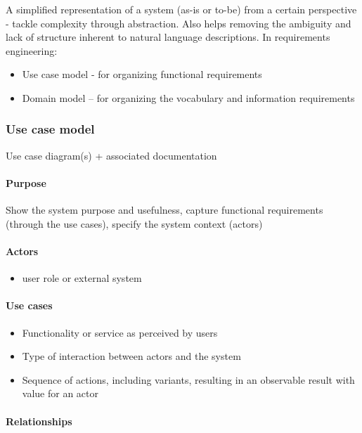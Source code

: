 \documentclass[../ESOF_notes.tex]{subfiles}
\begin{document}
A simplified representation of a system (as-is or to-be) from a certain perspective - tackle complexity through abstraction. 
Also helps removing the ambiguity and lack of structure inherent to natural language descriptions.
In requirements engineering:
\begin{itemize}
    \item Use case model - for organizing functional requirements
    \item Domain model – for organizing the vocabulary and information requirements
\end{itemize}


\subsubsection{Use case model}

Use case diagram(s) + associated documentation

\paragraph{Purpose} 

Show the system purpose and usefulness, capture functional requirements (through the use cases), specify the system context (actors)

\paragraph{Actors}
\begin{itemize}
    \item user role or external system
\end{itemize}

\paragraph{Use cases}
\begin{itemize}
    \item Functionality or service as perceived by users
    \item Type of interaction between actors and the system
    \item Sequence of actions, including variants, resulting in an observable
    result with value for an actor
    
\end{itemize}

\paragraph{Relationships}
\end{document}
